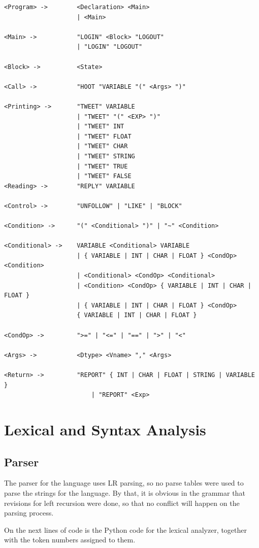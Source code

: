 \documentclass[11pt,a4paper]{report}
\begin{document}
\begin{lstlisting}
<Program> ->		<Declaration> <Main>
            		| <Main>
            
<Main> ->			"LOGIN" <Block> "LOGOUT"
          			| "LOGIN" "LOGOUT"
          			
<Block> ->			<State>

<Call> ->			"HOOT "VARIABLE "(" <Args> ")"

<Printing> -> 		"TWEET" VARIABLE
              		| "TWEET" "(" <EXP> ")"
              		| "TWEET" INT
              		| "TWEET" FLOAT
              		| "TWEET" CHAR
              		| "TWEET" STRING
              		| "TWEET" TRUE
              		| "TWEET" FALSE
<Reading> ->		"REPLY" VARIABLE

<Control> ->		"UNFOLLOW" | "LIKE" | "BLOCK"

<Condition> ->		"(" <Conditional> ")" | "~" <Condition>

<Conditional> ->	VARIABLE <Conditional> VARIABLE
          			| { VARIABLE | INT | CHAR | FLOAT } <CondOp> <Condition>
          			| <Conditional> <CondOp> <Conditional>
          			| <Condition> <CondOp> { VARIABLE | INT | CHAR | FLOAT }
          			| { VARIABLE | INT | CHAR | FLOAT } <CondOp>
          			{ VARIABLE | INT | CHAR | FLOAT }
          			
<CondOp> ->			">=" | "<=" | "==" | ">" | "<"

<Args> ->			<Dtype> <Vname> "," <Args>

<Return> ->			"REPORT" { INT | CHAR | FLOAT | STRING | VARIABLE }
						| "REPORT" <Exp>
\end{lstlisting}

\chapter{Lexical and Syntax Analysis}

\section{Parser}

The parser for the language uses LR parsing, so no parse tables were used to
parse the strings for the language. By that, it is obvious in the grammar that
revisions for left recursion were done, so that no conflict will happen on the
parsing process. \par

On the next lines of code is the Python code for the lexical analyzer, together
with the token numbers assigned to them.
\end{document}
